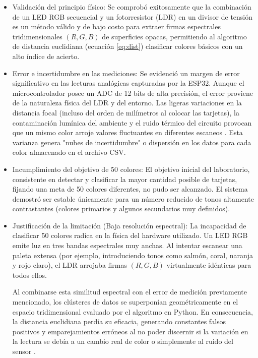 \documentclass[conference]{IEEEtran}
\begin{document}
\begin{itemize}
    \item Validación del principio físico: Se comprobó exitosamente que la combinación de un LED RGB secuencial y un fotorresistor (LDR) en un divisor de tensión es un método válido y de bajo costo para extraer firmas espectrales tridimensionales $(R, G, B)$ de superficies opacas, permitiendo al algoritmo de distancia euclidiana (ecuación \ref{eq:dist}) clasificar colores básicos con un alto índice de acierto.

    \item Error e incertidumbre en las mediciones: Se evidenció un margen de error significativo en las lecturas analógicas capturadas por la ESP32. Aunque el microcontrolador posee un ADC de 12 bits de alta precisión, el error proviene de la naturaleza física del LDR y del entorno. Las ligeras variaciones en la distancia focal (incluso del orden de milímetros al colocar las tarjetas), la contaminación lumínica del ambiente y el ruido térmico del circuito provocan que un mismo color arroje valores fluctuantes en diferentes escaneos \cite{ldr_10}. Esta varianza genera "nubes de incertidumbre" o dispersión en los datos para cada color almacenado en el archivo CSV.

    \item Incumplimiento del objetivo de 50 colores: El objetivo inicial del laboratorio, consistente en detectar y clasificar la mayor cantidad posible de tarjetas, fijando una meta de 50 colores diferentes, no pudo ser alcanzado. El sistema demostró ser estable únicamente para un número reducido de tonos altamente contrastantes (colores primarios y algunos secundarios muy definidos).

    \item Justificación de la limitación (Baja resolución espectral): La incapacidad de clasificar 50 colores radica en la física del hardware utilizado. Un LED RGB emite luz en tres bandas espectrales muy anchas. Al intentar escanear una paleta extensa (por ejemplo, introduciendo tonos como salmón, coral, naranja y rojo claro), el LDR arrojaba firmas $(R, G, B)$ virtualmente idénticas para todos ellos.
    
    Al combinarse esta similitud espectral con el error de medición previamente mencionado, los clústeres de datos se superponían geométricamente en el espacio tridimensional evaluado por el algoritmo en Python. En consecuencia, la distancia euclidiana perdía su eficacia, generando constantes falsos positivos y emparejamientos erróneos al no poder discernir si la variación en la lectura se debía a un cambio real de color o simplemente al ruido del sensor \cite{ldr_10}.


\end{itemize}
\end{document}

